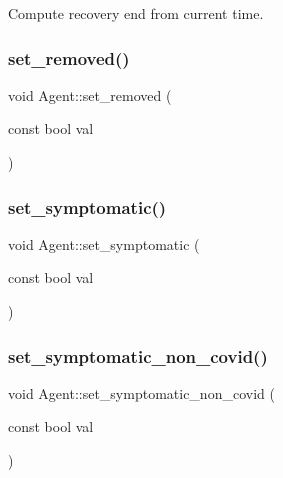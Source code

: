 Compute recovery end from current time. 

\mbox{\label{classAgent_a9f817ef4dd7715e59da98956acb9803a}} 
\subsubsection{\texorpdfstring{set\+\_\+removed()}{set\_removed()}}
{\footnotesize\ttfamily void Agent\+::set\+\_\+removed (\begin{DoxyParamCaption}\item[{const bool}]{val }\end{DoxyParamCaption})\hspace{0.3cm}{\ttfamily [inline]}}

\mbox{\label{classAgent_a4fe846deec4401a76f437c9b3276b9a2}} 
\subsubsection{\texorpdfstring{set\+\_\+symptomatic()}{set\_symptomatic()}}
{\footnotesize\ttfamily void Agent\+::set\+\_\+symptomatic (\begin{DoxyParamCaption}\item[{const bool}]{val }\end{DoxyParamCaption})\hspace{0.3cm}{\ttfamily [inline]}}

\mbox{\label{classAgent_a5d8cc1ff3240d83154cb0ec3ea1c65a1}} 
\subsubsection{\texorpdfstring{set\+\_\+symptomatic\+\_\+non\+\_\+covid()}{set\_symptomatic\_non\_covid()}}
{\footnotesize\ttfamily void Agent\+::set\+\_\+symptomatic\+\_\+non\+\_\+covid (\begin{DoxyParamCaption}\item[{const bool}]{val }\end{DoxyParamCaption})\hspace{0.3cm}{\ttfamily [inline]}}

